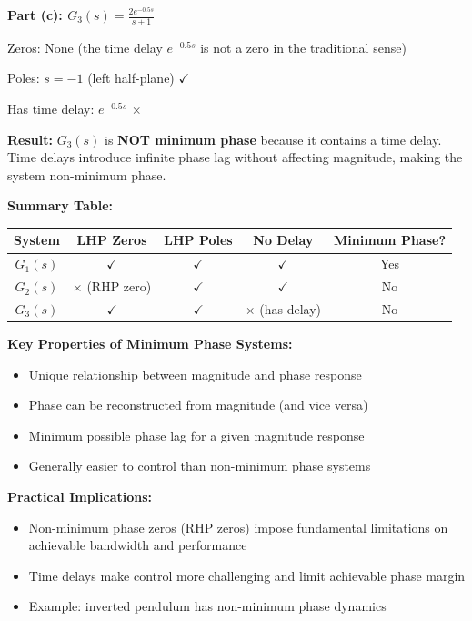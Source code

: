 \documentclass[11pt,a4paper]{article}
\begin{document}
\textbf{Part (c): $G_3(s) = \frac{2e^{-0.5s}}{s+1}$}

Zeros: None (the time delay $e^{-0.5s}$ is not a zero in the traditional sense)

Poles: $s = -1$ (left half-plane) $\checkmark$

Has time delay: $e^{-0.5s}$ $\times$

\textbf{Result:} $G_3(s)$ is \textbf{NOT minimum phase} because it contains a time delay. Time delays introduce infinite phase lag without affecting magnitude, making the system non-minimum phase.

\textbf{Summary Table:}

\begin{center}
  \begin{tabular}{|c|c|c|c|c|}
    \hline
    System & LHP Zeros & LHP Poles & No Delay & Minimum Phase? \\
    \hline
    $G_1(s)$ & $\checkmark$ & $\checkmark$ & $\checkmark$ & Yes \\
    $G_2(s)$ & $\times$ (RHP zero) & $\checkmark$ & $\checkmark$ & No \\
    $G_3(s)$ & $\checkmark$ & $\checkmark$ & $\times$ (has delay) & No \\
    \hline
  \end{tabular}
\end{center}

\textbf{Key Properties of Minimum Phase Systems:}
\begin{itemize}
  \item Unique relationship between magnitude and phase response
  \item Phase can be reconstructed from magnitude (and vice versa)
  \item Minimum possible phase lag for a given magnitude response
  \item Generally easier to control than non-minimum phase systems
\end{itemize}

\textbf{Practical Implications:}
\begin{itemize}
  \item Non-minimum phase zeros (RHP zeros) impose fundamental limitations on achievable bandwidth and performance
  \item Time delays make control more challenging and limit achievable phase margin
  \item Example: inverted pendulum has non-minimum phase dynamics
\end{itemize}
\end{document}
